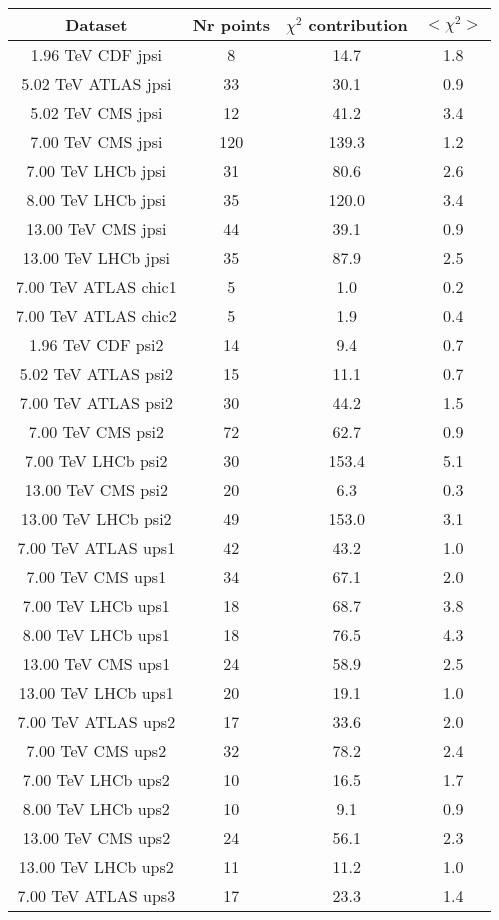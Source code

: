 \begin{table}[h!]
\centering
\begin{tabular}{c|c|c|c}
Dataset & Nr points & $\chi^2$ contribution & $<\chi^2>$ \\
\hline
1.96 TeV CDF jpsi & 8 & 14.7 & 1.8 \\
5.02 TeV ATLAS jpsi & 33 & 30.1 & 0.9 \\
5.02 TeV CMS jpsi & 12 & 41.2 & 3.4 \\
7.00 TeV CMS jpsi & 120 & 139.3 & 1.2 \\
7.00 TeV LHCb jpsi & 31 & 80.6 & 2.6 \\
8.00 TeV LHCb jpsi & 35 & 120.0 & 3.4 \\
13.00 TeV CMS jpsi & 44 & 39.1 & 0.9 \\
13.00 TeV LHCb jpsi & 35 & 87.9 & 2.5 \\
7.00 TeV ATLAS chic1 & 5 & 1.0 & 0.2 \\
7.00 TeV ATLAS chic2 & 5 & 1.9 & 0.4 \\
1.96 TeV CDF psi2 & 14 & 9.4 & 0.7 \\
5.02 TeV ATLAS psi2 & 15 & 11.1 & 0.7 \\
7.00 TeV ATLAS psi2 & 30 & 44.2 & 1.5 \\
7.00 TeV CMS psi2 & 72 & 62.7 & 0.9 \\
7.00 TeV LHCb psi2 & 30 & 153.4 & 5.1 \\
13.00 TeV CMS psi2 & 20 & 6.3 & 0.3 \\
13.00 TeV LHCb psi2 & 49 & 153.0 & 3.1 \\
7.00 TeV ATLAS ups1 & 42 & 43.2 & 1.0 \\
7.00 TeV CMS ups1 & 34 & 67.1 & 2.0 \\
7.00 TeV LHCb ups1 & 18 & 68.7 & 3.8 \\
8.00 TeV LHCb ups1 & 18 & 76.5 & 4.3 \\
13.00 TeV CMS ups1 & 24 & 58.9 & 2.5 \\
13.00 TeV LHCb ups1 & 20 & 19.1 & 1.0 \\
7.00 TeV ATLAS ups2 & 17 & 33.6 & 2.0 \\
7.00 TeV CMS ups2 & 32 & 78.2 & 2.4 \\
7.00 TeV LHCb ups2 & 10 & 16.5 & 1.7 \\
8.00 TeV LHCb ups2 & 10 & 9.1 & 0.9 \\
13.00 TeV CMS ups2 & 24 & 56.1 & 2.3 \\
13.00 TeV LHCb ups2 & 11 & 11.2 & 1.0 \\
7.00 TeV ATLAS ups3 & 17 & 23.3 & 1.4 \\

\end{tabular}
\end{table}
